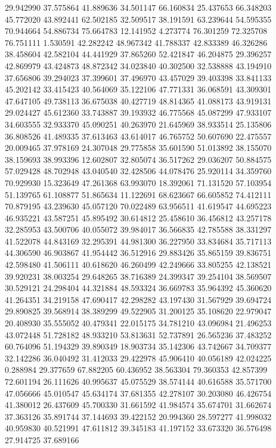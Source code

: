 29.942990
37.575864
41.889636
34.501147
66.160834
25.437653
66.348203
45.772020
43.892441
62.502185
32.509517
38.191591
63.239644
54.595355
70.944664
54.886734
75.664783
12.141952
4.273774
76.301259
72.325708
76.751111
1.530591
42.282242
48.967342
41.788337
42.833389
46.326286
38.458604
42.582104
44.441929
37.865260
52.421847
46.204875
29.396257
42.869979
43.424873
48.872342
34.023840
40.302500
32.538888
43.194910
37.656806
39.294023
37.399601
37.496970
43.457029
39.403398
33.841133
45.202142
33.415423
40.564069
35.122106
47.771331
36.068591
43.309301
47.647105
49.738113
36.675038
40.427719
48.814365
41.088173
43.919131
29.024427
45.612360
33.743887
39.193932
46.775568
45.087299
47.933107
34.603555
32.933370
45.090251
40.263970
21.645969
38.933514
25.135806
36.808526
41.489335
37.613463
43.614017
46.765752
50.607690
22.475557
20.009465
37.978169
24.307048
29.775858
35.601590
51.013892
38.155070
38.159693
38.993396
12.602807
32.805074
36.517262
29.036207
50.884575
57.029428
48.702948
43.040540
32.428506
44.078476
25.920114
34.359760
70.929930
15.323649
47.261368
63.993070
18.392061
71.131520
57.103954
51.139765
61.108877
51.865634
11.122691
68.623667
66.605852
74.412111
70.879195
43.239630
45.057120
70.022489
63.956511
41.619547
44.695223
46.935221
43.587251
45.895492
30.614812
25.458610
36.456812
43.257178
32.285953
43.500706
40.055072
39.984017
36.566835
42.785588
38.331297
41.522078
44.843169
32.295391
44.981300
36.227950
33.834684
35.717113
44.306590
46.903867
41.954442
36.512916
29.883426
35.865159
39.836751
42.598480
41.506111
40.618620
46.260499
42.249666
33.805255
42.138521
39.920231
38.003254
29.648265
38.716389
24.399347
39.254104
38.569507
30.529121
24.298404
44.321884
48.593324
36.669783
35.964392
45.360620
41.264351
34.219158
47.690417
42.298282
43.197430
31.567929
39.694724
29.890825
39.568914
38.389299
49.522905
31.200125
35.108620
22.979047
20.408930
35.555052
40.479341
22.015175
34.781210
43.096984
21.496253
43.072448
51.728182
48.933210
53.813631
52.737891
26.565236
37.483252
60.764096
51.194329
39.890349
18.903734
35.142306
43.742667
34.709377
32.142286
36.040492
31.412033
29.422978
45.906410
40.056189
42.024225
0.288984
29.377659
67.882205
60.436952
38.563304
79.360353
42.857399
72.601194
26.111626
40.995637
45.075529
38.574144
40.616588
35.571700
47.056666
45.010547
45.634174
37.681355
42.278107
30.203080
46.426754
41.380012
26.437609
45.700330
31.661592
41.984574
35.674701
31.662674
37.363126
35.891744
37.144693
39.422152
20.994360
28.597277
41.998032
40.959830
40.521991
47.611812
39.345183
41.197152
33.673320
36.576498
27.914725
37.689166
